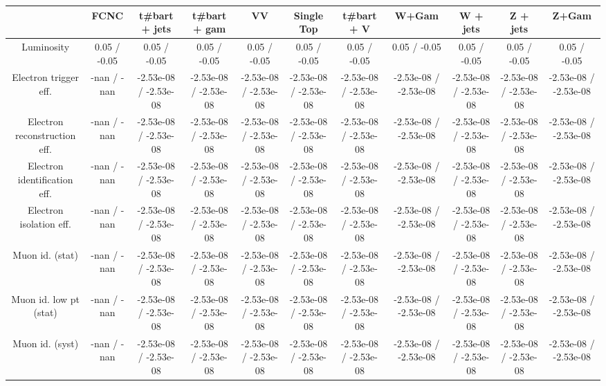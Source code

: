 \begin{table}[htbp]
\begin{center}
\footnotesize
\begin{tabular}{|c|c|c|c|c|c|c|c|c|c|c|}
\hline 
      & FCNC      & t#bar{t} + jets      & t#bar{t} +  gam      & VV      & Single Top      & t#bar{t} + V      & W+Gam      & W + jets      & Z + jets      & Z+Gam \\ 
\hline 
  Luminosity & 0.05 / -0.05 & 0.05 / -0.05 & 0.05 / -0.05 & 0.05 / -0.05 & 0.05 / -0.05 & 0.05 / -0.05 & 0.05 / -0.05 & 0.05 / -0.05 & 0.05 / -0.05 & 0.05 / -0.05 \\ 
  Electron trigger eff. & -nan / -nan & -2.53e-08 / -2.53e-08 & -2.53e-08 / -2.53e-08 & -2.53e-08 / -2.53e-08 & -2.53e-08 / -2.53e-08 & -2.53e-08 / -2.53e-08 & -2.53e-08 / -2.53e-08 & -2.53e-08 / -2.53e-08 & -2.53e-08 / -2.53e-08 & -2.53e-08 / -2.53e-08 \\ 
  Electron reconstruction eff. & -nan / -nan & -2.53e-08 / -2.53e-08 & -2.53e-08 / -2.53e-08 & -2.53e-08 / -2.53e-08 & -2.53e-08 / -2.53e-08 & -2.53e-08 / -2.53e-08 & -2.53e-08 / -2.53e-08 & -2.53e-08 / -2.53e-08 & -2.53e-08 / -2.53e-08 & -2.53e-08 / -2.53e-08 \\ 
  Electron identification eff. & -nan / -nan & -2.53e-08 / -2.53e-08 & -2.53e-08 / -2.53e-08 & -2.53e-08 / -2.53e-08 & -2.53e-08 / -2.53e-08 & -2.53e-08 / -2.53e-08 & -2.53e-08 / -2.53e-08 & -2.53e-08 / -2.53e-08 & -2.53e-08 / -2.53e-08 & -2.53e-08 / -2.53e-08 \\ 
  Electron isolation eff. & -nan / -nan & -2.53e-08 / -2.53e-08 & -2.53e-08 / -2.53e-08 & -2.53e-08 / -2.53e-08 & -2.53e-08 / -2.53e-08 & -2.53e-08 / -2.53e-08 & -2.53e-08 / -2.53e-08 & -2.53e-08 / -2.53e-08 & -2.53e-08 / -2.53e-08 & -2.53e-08 / -2.53e-08 \\ 
  Muon id. (stat) & -nan / -nan & -2.53e-08 / -2.53e-08 & -2.53e-08 / -2.53e-08 & -2.53e-08 / -2.53e-08 & -2.53e-08 / -2.53e-08 & -2.53e-08 / -2.53e-08 & -2.53e-08 / -2.53e-08 & -2.53e-08 / -2.53e-08 & -2.53e-08 / -2.53e-08 & -2.53e-08 / -2.53e-08 \\ 
  Muon id. low pt (stat) & -nan / -nan & -2.53e-08 / -2.53e-08 & -2.53e-08 / -2.53e-08 & -2.53e-08 / -2.53e-08 & -2.53e-08 / -2.53e-08 & -2.53e-08 / -2.53e-08 & -2.53e-08 / -2.53e-08 & -2.53e-08 / -2.53e-08 & -2.53e-08 / -2.53e-08 & -2.53e-08 / -2.53e-08 \\ 
  Muon id. (syst) & -nan / -nan & -2.53e-08 / -2.53e-08 & -2.53e-08 / -2.53e-08 & -2.53e-08 / -2.53e-08 & -2.53e-08 / -2.53e-08 & -2.53e-08 / -2.53e-08 & -2.53e-08 / -2.53e-08 & -2.53e-08 / -2.53e-08 & -2.53e-08 / -2.53e-08 & -2.53e-08 / -2.53e-08 \\ 

\end{tabular}
\end{center}
\end{table}
